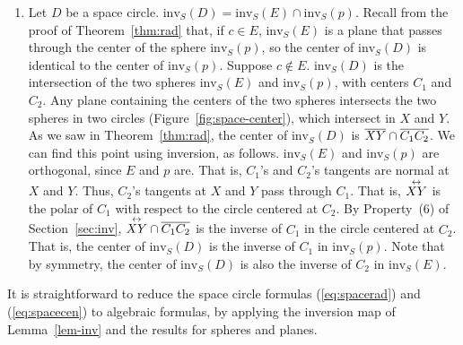 \begin{enumerate}
\item
Let $D$ be a space circle.
$\mbox{inv}_{S}(D) = \mbox{inv}_{S}(E) \cap \mbox{inv}_{S}(p)$.
Recall from the proof of Theorem~\ref{thm:rad} that,
if $c \in E$, $\mbox{inv}_{S}(E)$ is a plane that passes 
through the center of the sphere $\mbox{inv}_{S}(p)$,
so the center of $\mbox{inv}_{S}(D)$ is identical to the center of  
$\mbox{inv}_{S}(p)$.
Suppose $c \not \in E$.
$\mbox{inv}_{S}(D)$ is the intersection of the two spheres $\mbox{inv}_{S}(E)$
and $\mbox{inv}_{S}(p)$,
with centers $C_1$ and $C_2$.
Any plane containing the centers of the two spheres 
intersects the two spheres in two circles (Figure~\ref{fig:space-center}),
which intersect in $X$ and $Y$.
As we saw in Theorem~\ref{thm:rad}, the center of $\mbox{inv}_S(D)$ is 
$\mbox{$\overline{XY}$} \cap \mbox{$\overline{C_{1}C_{2}}$}$.
We can find this point using inversion, as follows.
$\mbox{inv}_{S}(E)$ and $\mbox{inv}_{S}(p)$ are orthogonal,
since $E$ and $p$ are.
That is, $C_1$'s and $C_2$'s tangents are normal at $X$ and $Y$.
Thus, $C_2$'s tangents at $X$ and $Y$ pass through $C_{1}$.
That is, $\mbox{$\stackrel{\leftrightarrow}{XY}$}$ is the polar of $C_{1}$ with respect to the circle
centered at $C_{2}$.
By Property~(6) of Section~\ref{sec:inv},
$\mbox{$\stackrel{\leftrightarrow}{XY}$} \cap \mbox{$\overline{C_{1}C_{2}}$}$ is
the inverse of $C_{1}$ in the circle centered at $C_{2}$.
That is, the center of $\mbox{inv}_{S}(D)$ is the inverse of $C_1$ in
$\mbox{inv}_{S}(p)$.
Note that by symmetry, the center of $\mbox{inv}_{S}(D)$ is also the inverse 
of $C_2$ in
$\mbox{inv}_{S}(E)$.
\end{enumerate}
\QED


It is straightforward to reduce the space circle formulas 
(\ref{eq:spacerad}) and 
(\ref{eq:spacecen}) to algebraic formulas, by applying the inversion map 
of Lemma~\ref{lem-inv} and the results for spheres and planes.

